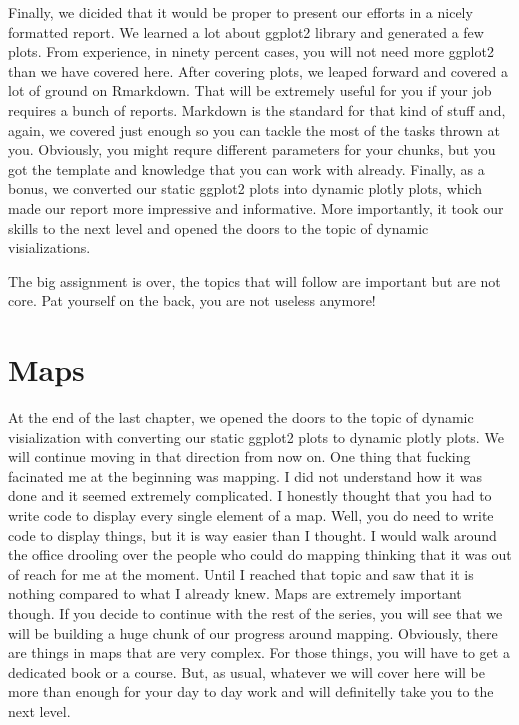 \documentclass[]{book}
\begin{document}
Finally, we dicided that it would be proper to present our efforts in a nicely formatted report. We learned a lot about ggplot2 library and generated a few plots. From experience, in ninety percent cases, you will not need more ggplot2 than we have covered here. After covering plots, we leaped forward and covered a lot of ground on Rmarkdown. That will be extremely useful for you if your job requires a bunch of reports. Markdown is the standard for that kind of stuff and, again, we covered just enough so you can tackle the most of the tasks thrown at you. Obviously, you might requre different parameters for your chunks, but you got the template and knowledge that you can work with already. Finally, as a bonus, we converted our static ggplot2 plots into dynamic plotly plots, which made our report more impressive and informative. More importantly, it took our skills to the next level and opened the doors to the topic of dynamic visializations.

The big assignment is over, the topics that will follow are important but are not core. Pat yourself on the back, you are not useless anymore!

\hypertarget{maps}{%
\chapter{Maps}\label{maps}}

At the end of the last chapter, we opened the doors to the topic of dynamic visialization with converting our static ggplot2 plots to dynamic plotly plots. We will continue moving in that direction from now on. One thing that fucking facinated me at the beginning was mapping. I did not understand how it was done and it seemed extremely complicated. I honestly thought that you had to write code to display every single element of a map. Well, you do need to write code to display things, but it is way easier than I thought. I would walk around the office drooling over the people who could do mapping thinking that it was out of reach for me at the moment. Until I reached that topic and saw that it is nothing compared to what I already knew. Maps are extremely important though. If you decide to continue with the rest of the series, you will see that we will be building a huge chunk of our progress around mapping. Obviously, there are things in maps that are very complex. For those things, you will have to get a dedicated book or a course. But, as usual, whatever we will cover here will be more than enough for your day to day work and will definitelly take you to the next level.
\end{document}
